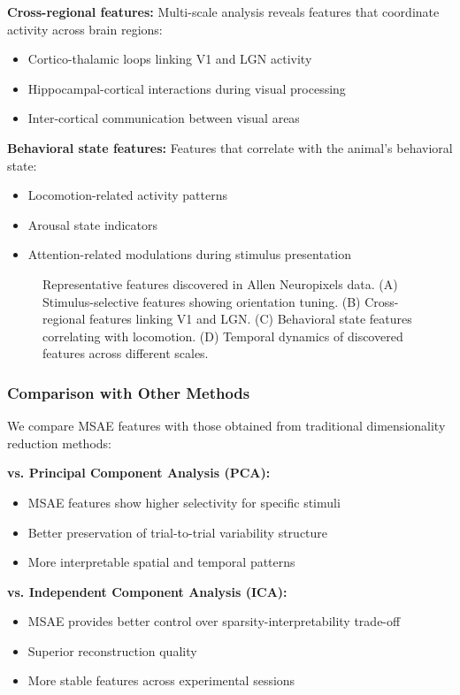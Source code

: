 \textbf{Cross-regional features:} Multi-scale analysis reveals features that coordinate activity across brain regions:
\begin{itemize}
\item Cortico-thalamic loops linking V1 and LGN activity
\item Hippocampal-cortical interactions during visual processing
\item Inter-cortical communication between visual areas
\end{itemize}

\textbf{Behavioral state features:} Features that correlate with the animal's behavioral state:
\begin{itemize}
\item Locomotion-related activity patterns
\item Arousal state indicators
\item Attention-related modulations during stimulus presentation
\end{itemize}

\begin{figure}[h]
\centering
\caption{Representative features discovered in Allen Neuropixels data. (A) Stimulus-selective features showing orientation tuning. (B) Cross-regional features linking V1 and LGN. (C) Behavioral state features correlating with locomotion. (D) Temporal dynamics of discovered features across different scales.}
\label{fig:allen_features}
\end{figure}

\subsubsection{Comparison with Other Methods}

We compare MSAE features with those obtained from traditional dimensionality reduction methods:

\textbf{vs. Principal Component Analysis (PCA):}
\begin{itemize}
\item MSAE features show higher selectivity for specific stimuli
\item Better preservation of trial-to-trial variability structure
\item More interpretable spatial and temporal patterns
\end{itemize}

\textbf{vs. Independent Component Analysis (ICA):}
\begin{itemize}
\item MSAE provides better control over sparsity-interpretability trade-off
\item Superior reconstruction quality
\item More stable features across experimental sessions
\end{itemize}

